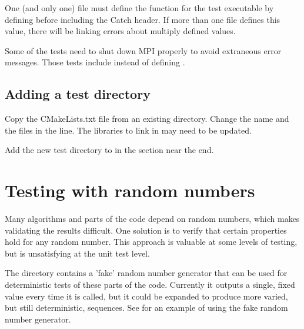 One (and only one) file must define the  function for the test executable by defining  before including the Catch header.  If more than one file defines this value, there will be linking errors about multiply defined values.

Some of the tests need to shut down MPI properly to avoid extraneous error messages. Those tests include  instead of defining .


\subsection{Adding a test directory}
Copy the CMakeLists.txt file from an existing  directory.
Change the  name and the  files in the  line.  The libraries to link in  may need to be updated.

Add the new test directory to  in the  section near the end.


\section{Testing with random numbers}
Many algorithms and parts of the code depend on random numbers, which makes validating the results difficult.
One solution is to verify that certain properties hold for any random number.
This approach is valuable at some levels of testing, but is unsatisfying at the unit test level.

The  directory contains a 'fake' random number generator that can be used for deterministic tests of these parts of the code.
Currently it outputs a single, fixed value every time it is called, but it could be expanded to produce more varied, but still deterministic, sequences.
See  for an example of using the fake random number generator.
